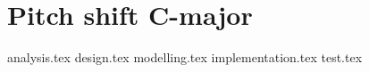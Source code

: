 
\chapter{Pitch shift C-major}
{analysis.tex}
{design.tex}
{modelling.tex}
{implementation.tex}
{test.tex}